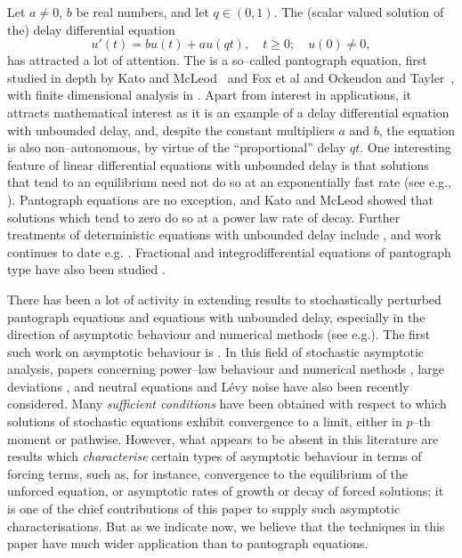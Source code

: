 \documentclass[a4paper,10pt,reqno]{amsart}
\numberwithin{equation}{section}
\theoremstyle{definition}
\theoremstyle{remark}
\DeclareMathOperator{\1}{\mathbbm 1}
\begin{document}
	Let $a\neq 0$, $b$ be real numbers, and let $q\in (0,1)$. The (scalar valued solution of the) delay differential equation  
	\begin{equation}\label{eq.unforced}
		u'(t)=bu(t)+au(qt), \quad t\geq 0; \quad u(0)\neq 0,
	\end{equation}
	has attracted a lot of attention. The is a so--called pantograph equation, first studied in depth by Kato and McLeod~\cite{KatoMc} and Fox et al and Ockendon and Tayler~\cite{Foxetal,OckTay}, with finite dimensional analysis in \cite{CarrD1,CarrDyson2}. Apart from interest in applications, it attracts mathematical interest as it is an example of a delay differential equation with unbounded delay, and, despite the constant multipliers $a$ and $b$, the equation is also non--autonomous, by virtue of the ``proportional'' delay $qt$. One interesting feature of linear differential equations with unbounded delay is that solutions that tend to an equilibrium need not do so at an exponentially fast rate (see e.g., \cite{AppBuck10,Kris88,MakTerj,Diblik98,DibRuz}). Pantograph equations are no exception, and Kato and McLeod \cite{KatoMc} showed that solutions which tend to zero do so at a power law rate of decay. Further treatments of deterministic equations with unbounded delay include \cite{cermak, HaddKris, Iser, Liu}, and work continues to date e.g. \cite{cer2022}. Fractional and integrodifferential equations of pantograph type have also been studied \cite{MR4534554}.
	
	There has been a lot of activity in extending results to stochastically perturbed pantograph equations and equations with unbounded delay, especially in the direction of asymptotic behaviour and numerical methods (see e.g.\cite{App2005, BakBuck2000,BakBuck2005, Fan,Huang,Huetal,Jiang,LiuChen,Meng1,Meng2,PJ2012, YanHuang,Yangetc}). The first such work on asymptotic behaviour is \cite{AppBuck2016}. In this field of stochastic asymptotic analysis, papers concerning power--law behaviour and numerical methods \cite{MR4439350,MR3927238,Milo}, large deviations \cite{MR4585696}, and neutral equations \cite{MR4278069} and L\'evy noise \cite{MR4053553} have also been recently considered. 
	Many \textit{sufficient conditions} have been obtained with respect to which solutions of stochastic equations exhibit convergence to a limit, either in $p$--th moment or pathwise. However, what appears to be absent in this literature are results which \textit{characterise} certain types of asymptotic behaviour in terms of forcing terms, such as, for instance, convergence to the equilibrium of the unforced equation, or asymptotic rates of growth or decay of forced solutions; it is one of the chief contributions of this paper to supply such asymptotic characterisations. But as we indicate now, we believe that the techniques in this paper have much wider application than to pantograph equations. 
	
\end{document}
